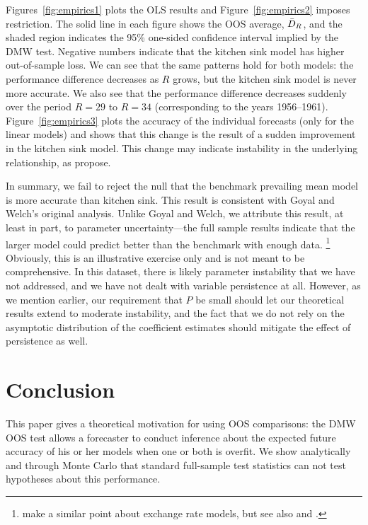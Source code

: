 \documentclass[12pt]{article}
\begin{document}
Figures~\ref{fig:empirics1} plots the OLS results and
Figure~\ref{fig:empirics2} imposes  restriction.  The
solid line in each figure shows the OOS average, $\bar{D}_{R}$, and the
shaded region indicates the 95\% one-sided confidence interval implied
by the DMW test.  Negative numbers indicate that the kitchen sink
model has higher out-of-sample loss.  We can see that the same
patterns hold for both models: the performance difference decreases as
$R$ grows, but the kitchen sink model is never more accurate.  We also
see that the performance difference decreases suddenly over the period
$R=29$ to $R=34$ (corresponding to the years 1956--1961).
Figure~\ref{fig:empirics3} plots the accuracy of the individual
forecasts (only for the linear models) and shows that this change is
the result of a sudden improvement in the kitchen sink model.  This
change may indicate instability in the underlying relationship, as
\citet{GoW:08} propose.

In summary, we fail to reject the null that the benchmark prevailing
mean model is more accurate than  kitchen sink.  This
result is consistent with Goyal and Welch's original analysis.  Unlike
Goyal and Welch, we attribute this result, at least in part, to
parameter uncertainty---the full sample results indicate that the
larger model could predict better than the benchmark with enough
data.%
\footnote{\citet{BWB:10} make a similar point about exchange rate
models, but see also \citet{Chi:10} and \citet{Gia:10}.} %
Obviously, this is an illustrative exercise only and is not meant to
be comprehensive.  In this dataset, there is likely parameter
instability that we have not addressed, and we have not dealt with
variable persistence at all.  However, as we mention earlier, our
requirement that $P$ be small should let our theoretical results
extend to moderate instability, and the fact that we do not rely on
the asymptotic distribution of the coefficient estimates should
mitigate the effect of persistence as well.

\section{Conclusion}
\label{sec:conclusion}

This paper gives a theoretical motivation for using OOS comparisons:
the DMW OOS test allows a forecaster to conduct inference about
the expected future accuracy of his or her models when one or both is
overfit.  We show analytically and through Monte Carlo that standard
full-sample test statistics can not test hypotheses about this
performance.
\end{document}
